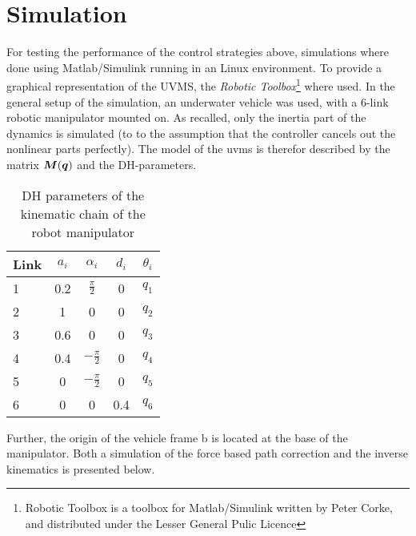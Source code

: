 \section{Simulation}
\label{sec:simulation}
For testing the performance of the control strategies above, simulations where done using Matlab/Simulink running in an Linux environment. To provide a graphical representation of the UVMS, the \textit{Robotic Toolbox}\footnote{Robotic Toolbox is a toolbox for Matlab/Simulink written by Peter Corke, and distributed under the Lesser General Pulic Licence} where used. 
In the general setup of the simulation, an underwater vehicle was used, with a 6-link robotic manipulator mounted on. 
As recalled, only the inertia part of the dynamics is simulated (to to the assumption that the controller cancels out the nonlinear parts perfectly). The model of the uvms is therefor described by the matrix $\boldsymbol M(\boldsymbol q)$ and the DH-parameters.

\begin{table}[h!] %
\caption{DH parameters of the kinematic chain of the robot manipulator} %
\centering %
\begin{tabular}{l c c c c } %
\toprule %
Link & $ a_i $ & $ \alpha_i $ & $ d_i $ & $ \theta_i$ \\ %
\midrule %
1 & 0.2 & $\frac{\pi}{2}$ & 0 & $q_{1}$ \\ %
2 & 1 &0 & 0 & $q_{2}$ \\ %
3 & 0.6 & 0 & 0 & $q_{3}$ \\ %
4 & 0.4 & $-\frac{\pi}{2}$ & 0 & $q_{4}$ \\ %
5 & 0 & $-\frac{\pi}{2}$ & 0 & $q_{5}$ \\ %
6 & 0 & 0& 0.4 & $q_{6}$ \\ %
\bottomrule %
\end{tabular}
\label{tab:template} %
\end{table}
Further, the origin of the vehicle frame \frame b is located at the base of the manipulator. Both a simulation of the force based path correction and the inverse kinematics is presented below. 

